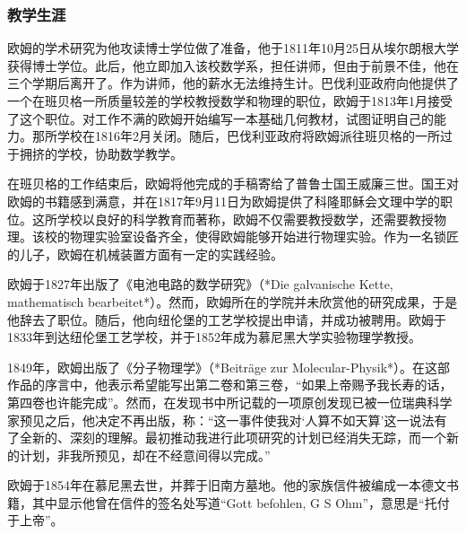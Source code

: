 \subsubsection{教学生涯} 
欧姆的学术研究为他攻读博士学位做了准备，他于1811年10月25日从埃尔朗根大学获得博士学位。此后，他立即加入该校数学系，担任讲师，但由于前景不佳，他在三个学期后离开了。作为讲师，他的薪水无法维持生计。巴伐利亚政府向他提供了一个在班贝格一所质量较差的学校教授数学和物理的职位，欧姆于1813年1月接受了这个职位。对工作不满的欧姆开始编写一本基础几何教材，试图证明自己的能力。那所学校在1816年2月关闭。随后，巴伐利亚政府将欧姆派往班贝格的一所过于拥挤的学校，协助数学教学。


在班贝格的工作结束后，欧姆将他完成的手稿寄给了普鲁士国王威廉三世。国王对欧姆的书籍感到满意，并在1817年9月11日为欧姆提供了科隆耶稣会文理中学的职位。这所学校以良好的科学教育而著称，欧姆不仅需要教授数学，还需要教授物理。该校的物理实验室设备齐全，使得欧姆能够开始进行物理实验。作为一名锁匠的儿子，欧姆在机械装置方面有一定的实践经验。

欧姆于1827年出版了《电池电路的数学研究》（*Die galvanische Kette, mathematisch bearbeitet*）。然而，欧姆所在的学院并未欣赏他的研究成果，于是他辞去了职位。随后，他向纽伦堡的工艺学校提出申请，并成功被聘用。欧姆于1833年到达纽伦堡工艺学校，并于1852年成为慕尼黑大学实验物理学教授。

1849年，欧姆出版了《分子物理学》（*Beiträge zur Molecular-Physik*）。在这部作品的序言中，他表示希望能写出第二卷和第三卷，“如果上帝赐予我长寿的话，第四卷也许能完成”。然而，在发现书中所记载的一项原创发现已被一位瑞典科学家预见之后，他决定不再出版，称：“这一事件使我对‘人算不如天算’这一说法有了全新的、深刻的理解。最初推动我进行此项研究的计划已经消失无踪，而一个新的计划，非我所预见，却在不经意间得以完成。”

欧姆于1854年在慕尼黑去世，并葬于旧南方墓地。他的家族信件被编成一本德文书籍，其中显示他曾在信件的签名处写道“Gott befohlen, G S Ohm”，意思是“托付于上帝”。
